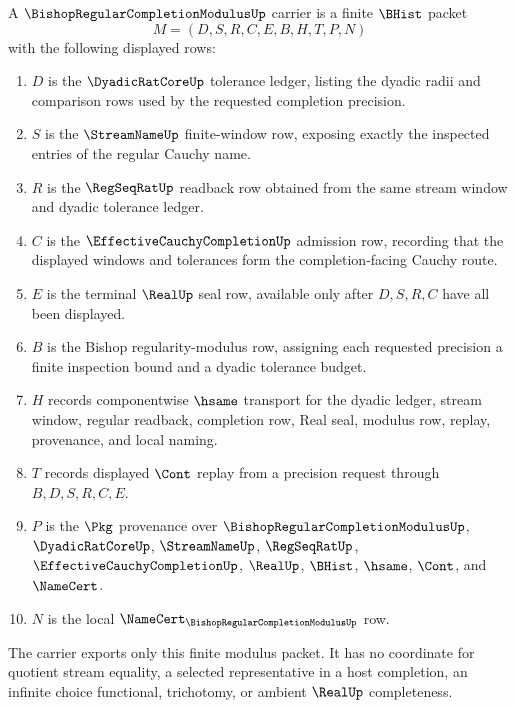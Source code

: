\begin{definition}
\label{def:bishop-regular-completion-modulus-carrier}
A $\BishopRegularCompletionModulusUp$ carrier is a finite $\BHist$ packet
$$
M=(D,S,R,C,E,B,H,T,P,N)
$$
with the following displayed rows:
\begin{enumerate}
\item $D$ is the $\DyadicRatCoreUp$ tolerance ledger, listing the dyadic radii and comparison rows used by the requested completion precision.
\item $S$ is the $\StreamNameUp$ finite-window row, exposing exactly the inspected entries of the regular Cauchy name.
\item $R$ is the $\RegSeqRatUp$ readback row obtained from the same stream window and dyadic tolerance ledger.
\item $C$ is the $\EffectiveCauchyCompletionUp$ admission row, recording that the displayed windows and tolerances form the completion-facing Cauchy route.
\item $E$ is the terminal $\RealUp$ seal row, available only after $D,S,R,C$ have all been displayed.
\item $B$ is the Bishop regularity-modulus row, assigning each requested precision a finite inspection bound and a dyadic tolerance budget.
\item $H$ records componentwise $\hsame$ transport for the dyadic ledger, stream window, regular readback, completion row, Real seal, modulus row, replay, provenance, and local naming.
\item $T$ records displayed $\Cont$ replay from a precision request through $B,D,S,R,C,E$.
\item $P$ is the $\Pkg$ provenance over $\BishopRegularCompletionModulusUp$, $\DyadicRatCoreUp$, $\StreamNameUp$, $\RegSeqRatUp$, $\EffectiveCauchyCompletionUp$, $\RealUp$, $\BHist$, $\hsame$, $\Cont$, and $\NameCert$.
\item $N$ is the local $\NameCert_{\BishopRegularCompletionModulusUp}$ row.
\end{enumerate}
The carrier exports only this finite modulus packet. It has no coordinate for quotient stream equality, a selected representative in a host completion, an infinite choice functional, trichotomy, or ambient $\RealUp$ completeness.
\end{definition}

